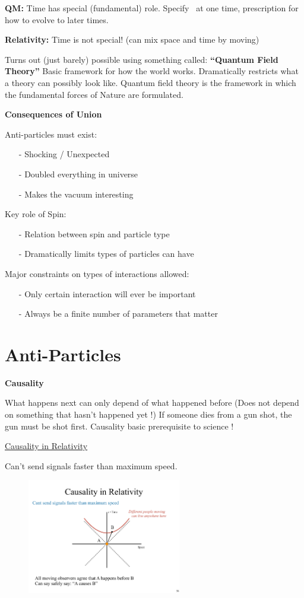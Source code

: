{\textbf{QM:} Time has special (fundamental) role. Specify \ketY\ at one time, prescription for how to evolve to later times.

\textbf{Relativity:} Time is not special! (can mix space and time by moving)

Turns out (just barely) possible using something called: \textbf{``Quantum Field Theory'' }
Basic framework for how the world works.
Dramatically restricts what a theory can possibly look like.
Quantum field theory is the framework in which the fundamental forces of Nature are formulated.

\textbf{Consequences of Union}

Anti-particles must exist:
\begin{itemize}
\item[-] Shocking / Unexpected
\item[-] Doubled everything in universe 
\item[-] Makes the vacuum interesting
\end{itemize}

Key role of Spin:
\begin{itemize}
\item[-] Relation between spin and particle type
\item[-] Dramatically limits types of particles can have
\end{itemize}

Major constraints on types of interactions allowed:
\begin{itemize}
\item[-] Only certain interaction will ever be important
\item[-] Always be a finite number of parameters that matter
\end{itemize}

\section{Anti-Particles}
\textbf{Causality}

What happens next can only depend of what happened before
(Does not depend on something that hasn't happened yet !)
If someone dies from a gun shot, the gun must be shot first.
Causality basic prerequisite to science !

\underline{Causality in Relativity}

Can't send signals faster than maximum speed.
\begin{figure}[h]
\centering
\includegraphics[width=0.6\textwidth]{./CausalityTimelike.pdf}
\end{figure}

}
